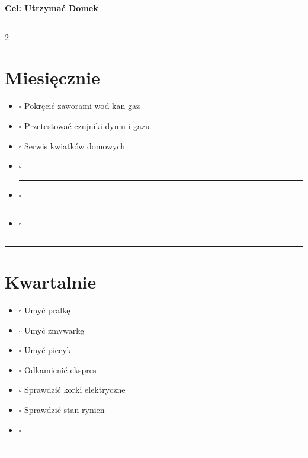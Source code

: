 \documentclass[a4paper, 12pt]{article} %
\newcommand{\midweekboxes}{%
    \leavevmode\unskip\nobreak%
    {\Large$\square$}%
    \hspace{1mm}{\Large$\square$}%
    \hspace{1mm}{\Large$\square$}%
    \hspace{1ex}
}
\begin{document}
\begin{center}
    {\Huge\bfseries Cel: Utrzymać Domek}
    \vspace{1em} %
\end{center}

\hrule


\begin{multicols}{2}

\section*{Miesięcznie}
\begin{itemize}
    \item \midweekboxes Pokręcić zaworami wod-kan-gaz
    \item \midweekboxes Przetestować czujniki dymu i gazu
    \item \midweekboxes Serwis kwiatków domowych
    \item \midweekboxes \rule[0pt]{5cm}{0.5pt}
    \item \midweekboxes \rule[0pt]{5cm}{0.5pt}
    \item \midweekboxes \rule[0pt]{5cm}{0.5pt}
\end{itemize}
\hrule

\section*{Kwartalnie}
\begin{itemize}
    \item \midweekboxes Umyć pralkę
    \item \midweekboxes Umyć zmywarkę
    \item \midweekboxes Umyć piecyk
    \item \midweekboxes Odkamienić ekspres
    \item \midweekboxes Sprawdzić korki elektryczne
    \item \midweekboxes Sprawdzić stan rynien
    \item \midweekboxes \rule[0pt]{5cm}{0.5pt}
\end{itemize}
\hrule

\end{multicols}
\end{document}
